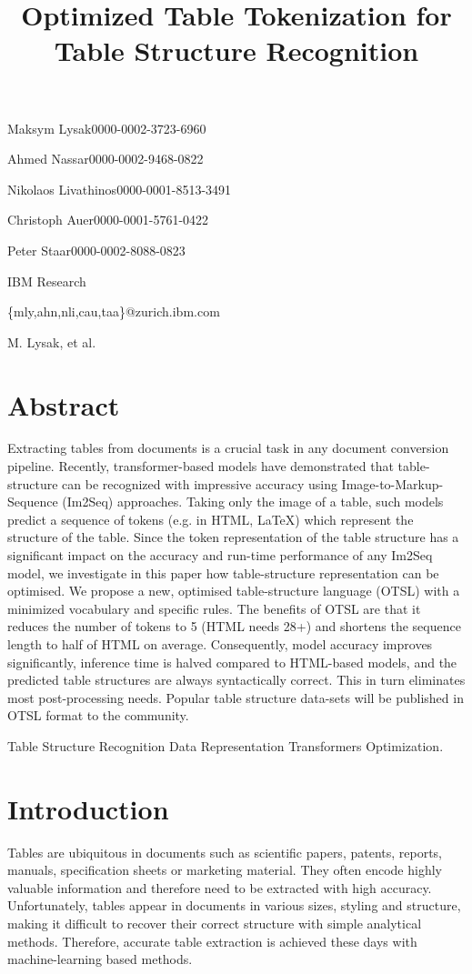 \documentclass[11pt,a4paper]{article}
\title{Optimized Table Tokenization for Table Structure Recognition}
\begin{document}
\maketitle

Maksym Lysak0000-0002-3723-6960

Ahmed Nassar0000-0002-9468-0822

Nikolaos Livathinos0000-0001-8513-3491

Christoph Auer0000-0001-5761-0422

Peter Staar0000-0002-8088-0823

IBM Research

\{mly,ahn,nli,cau,taa\}@zurich.ibm.com

M. Lysak, et al.

\section{Abstract}

Extracting tables from documents is a crucial task in any document conversion pipeline. Recently, transformer-based models have demonstrated that table-structure can be recognized with impressive accuracy using Image-to-Markup-Sequence (Im2Seq) approaches. Taking only the image of a table, such models predict a sequence of tokens (e.g. in HTML, LaTeX) which represent the structure of the table. Since the token representation of the table structure has a significant impact on the accuracy and run-time performance of any Im2Seq model, we investigate in this paper how table-structure representation can be optimised. We propose a new, optimised table-structure language (OTSL) with a minimized vocabulary and specific rules. The benefits of OTSL are that it reduces the number of tokens to 5 (HTML needs 28+) and shortens the sequence length to half of HTML on average. Consequently, model accuracy improves significantly, inference time is halved compared to HTML-based models, and the predicted table structures are always syntactically correct. This in turn eliminates most post-processing needs. Popular table structure data-sets will be published in OTSL format to the community.

Table Structure Recognition Data Representation Transformers Optimization.

\section{Introduction}

Tables are ubiquitous in documents such as scientific papers, patents, reports, manuals, specification sheets or marketing material. They often encode highly valuable information and therefore need to be extracted with high accuracy. Unfortunately, tables appear in documents in various sizes, styling and structure, making it difficult to recover their correct structure with simple analytical methods. Therefore, accurate table extraction is achieved these days with machine-learning based methods.
\end{document}

